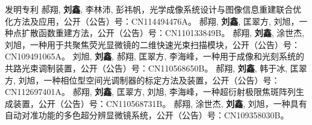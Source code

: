 \newcommand{\xin}{\textbf{刘鑫}}
\begin{rubric}{发明专利}
	\entry*%
    郝翔, \xin, 李林沛, 彭祎帆，光学成像系统设计与图像信息重建联合优化方法及应用，公开（公告）号：CN114494476A。
    \entry*%
    郝翔, \xin, 匡翠方, 刘旭，一种点扩散函数重建方法，公开（公告）号：CN110133849B。
    \entry*%
    郝翔, \xin, 涂世杰, 刘旭，一种用于共聚焦荧光显微镜的二维快速光束扫描模块，公开（公告）号：CN109491065A。
    \entry*%
    刘旭, \xin, 郝翔, 匡翠方, 李海峰，一种用于成像和光刻系统的共路光束调制装置，公开（公告）号：CN110568650B。
    \entry*%
    郝翔, \xin, 韩于冰, 匡翠方, 刘旭，一种相位型空间光调制器的标定方法及装置，公开（公告）号：CN112697401A。
    \entry*%
    郝翔, \xin, 匡翠方, 刘旭, 李海峰，一种超衍射极限焦斑阵列生成装置，公开（公告）号：CN110568731B。
    \entry*%
    郝翔, 涂世杰, \xin, 刘旭，一种具有自动对准功能的多色超分辨显微镜系统，公开（公告）号：CN109358030B。
\end{rubric}
